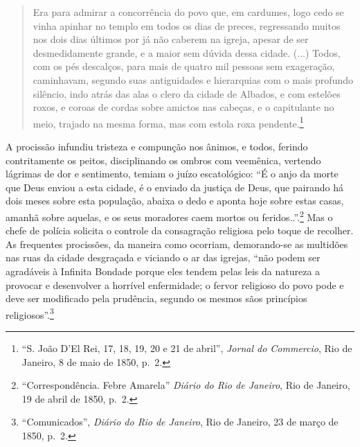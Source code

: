 \begin{quote}
Era para admirar a concorrência do povo que, em cardumes, logo cedo se
vinha apinhar no templo em todos os dias de preces, regressando muitos
nos dois dias últimos por já não caberem na igreja, apesar de ser
desmedidamente grande, e a maior sem dúvida dessa cidade. (...) Todos,
com os pés descalços, para mais de quatro mil pessoas sem exageração,
caminhavam, segundo suas antiguidades e hierarquias com o mais profundo
silêncio, indo atrás das alas o clero da cidade de Albados, e com
estelões roxos, e coroas de cordas sobre amictos nas cabeças, e o
capitulante no meio, trajado na mesma forma, mas com estola roxa
pendente.\footnote{``S. João D'El Rei, 17, 18, 19, 20 e 21 de abril'',
  \emph{Jornal do Commercio}, Rio de Janeiro, 8 de maio de 1850, p.~2.}
\end{quote}

A procissão infundiu tristeza e compunção nos ânimos, e todos, ferindo
contritamente os peitos, disciplinando os ombros com veemênica, vertendo
lágrimas de dor e sentimento, temiam o juízo escatológico: ``É o anjo da
morte que Deus enviou a esta cidade, é o enviado da justiça de Deus, que
pairando há dois meses sobre esta população, abaixa o dedo e aponta hoje
sobre estas casas, amanhã sobre aquelas, e os seus moradores caem mortos
ou feridos..''.\footnote{``Correspondência. Febre Amarela'' \emph{Diário
  do Rio de Janeiro}, Rio de Janeiro, 19 de abril de 1850, p.~2.} Mas o
chefe de polícia solicita o controle da consagração religiosa pelo toque
de recolher. As frequentes procissões, da maneira como ocorriam,
demorando-se as multidões nas ruas da cidade desgraçada e viciando o ar
das igrejas, ``não podem ser agradáveis à Infinita Bondade porque eles
tendem pelas leis da natureza a provocar e desenvolver a horrível
enfermidade; o fervor religioso do povo pode e deve ser modificado pela
prudência, segundo os mesmos sãos princípios religiosos''.\footnote{``Comunicados'',
  \emph{Diário do Rio de Janeiro}, Rio de Janeiro, 23 de março de 1850,
  p.~2.}

